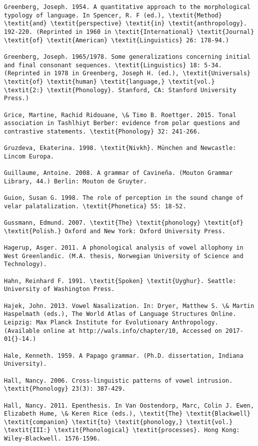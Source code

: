 \begin{verbatim}
Greenberg, Joseph. 1954. A quantitative approach to the morphological typology of language. In Spencer, R. F (ed.), \textit{Method} \textit{and} \textit{perspective} \textit{in} \textit{anthropology}. 192-220. (Reprinted in 1960 in \textit{International} \textit{Journal} \textit{of} \textit{American} \textit{Linguistics} 26: 178-94.)

Greenberg, Joseph. 1965/1978. Some generalizations concerning initial and final consonant sequences. \textit{Linguistics} 18: 5-34. (Reprinted in 1978 in Greenberg, Joseph H. (ed.), \textit{Universals} \textit{of} \textit{human} \textit{language,} \textit{vol.} \textit{2:} \textit{Phonology}. Stanford, CA: Stanford University Press.) 

Grice, Martine, Rachid Ridouane, \& Timo B. Roettger. 2015. Tonal association in Tashlhiyt Berber: evidence from polar questions and contrastive statements. \textit{Phonology} 32: 241-266.

Gruzdeva, Ekaterina. 1998. \textit{Nivkh}. München and Newcastle: Lincom Europa.

Guillaume, Antoine. 2008. A grammar of Cavineña. (Mouton Grammar Library, 44.) Berlin: Mouton de Gruyter.

Guion, Susan G. 1998. The role of perception in the sound change of velar palatalization. \textit{Phonetica} 55: 18-52.

Gussmann, Edmund. 2007. \textit{The} \textit{phonology} \textit{of} \textit{Polish.} Oxford and New York: Oxford University Press.

Hagerup, Asger. 2011. A phonological analysis of vowel allophony in West Greenlandic. (M.A. thesis, Norwegian University of Science and Technology).

Hahn, Reinhard F. 1991. \textit{Spoken} \textit{Uyghur}. Seattle: University of Washington Press.

Hajek, John. 2013. Vowel Nasalization. In: Dryer, Matthew S. \& Martin Haspelmath (eds.), The World Atlas of Language Structures Online. Leipzig: Max Planck Institute for Evolutionary Anthropology. (Available online at http://wals.info/chapter/10, Accessed on 2017-01{}-14.)

Hale, Kenneth. 1959. A Papago grammar. (Ph.D. dissertation, Indiana University).

Hall, Nancy. 2006. Cross-linguistic patterns of vowel intrusion. \textit{Phonology} 23(3): 387-429.

Hall, Nancy. 2011. Epenthesis. In Van Oostendorp, Marc, Colin J. Ewen, Elizabeth Hume, \& Keren Rice (eds.), \textit{The} \textit{Blackwell} \textit{companion} \textit{to} \textit{phonology,} \textit{vol.} \textit{III:} \textit{Phonological} \textit{processes}. Hong Kong: Wiley-Blackwell. 1576-1596.


\end{verbatim}
